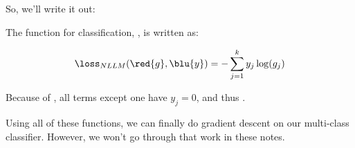         So, we'll write it out:\\
        
        \begin{kequation}
            The  function for  classification, , is written as:
            
            \begin{equation*}
                \loss_{NLLM}
                (\red{g} , \blu{y})
                =
                -\sum_{j=1}^k
                y_j \log(g_j)
            \end{equation*}
            
            Because of , all terms except one have $y_j=0$, and thus .
        \end{kequation}
        
        Using all of these functions, we can finally do gradient descent on our multi-class classifier. However, we won't go through that work in these notes.
